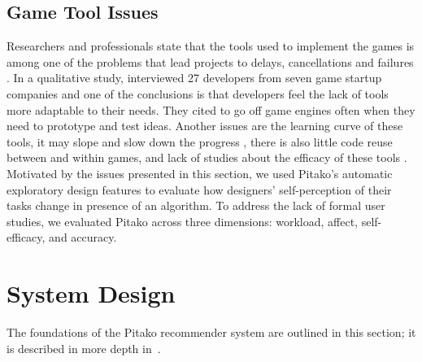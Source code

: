 \documentclass[letterpaper]{article} %
\begin{document}
\subsection{Game Tool Issues}
Researchers and professionals state that the tools used to implement the games is among one of the problems that lead  projects to delays, cancellations and failures \cite{petrillo2009went,washburn2016went}.
In a qualitative study,  \cite{Kasurinen:2013:GDE:2460999.2461004} interviewed 27 developers from seven game startup companies and one of the conclusions is that developers feel the lack of tools more adaptable to their needs. They cited to go off game engines often when they need to prototype and test ideas. Another issues are the learning curve of these tools, it may slope and slow down the progress \cite{Kasurinen:2013:GDE:2460999.2461004}, there is also little code reuse between and within games, and lack of studies about the efficacy of these tools \cite{murphy2014cowboys}.
Motivated by the issues presented in this section, we used Pitako's automatic exploratory design features to evaluate how designers' self-perception of their tasks change in presence of an algorithm. To address the lack of formal user studies, we evaluated Pitako across three dimensions: workload, affect, self-efficacy, and accuracy.

\section{System Design}
The foundations of the Pitako recommender system are outlined in this section; it is described in more depth in~\cite{machado2019pitako}.
\end{document}
